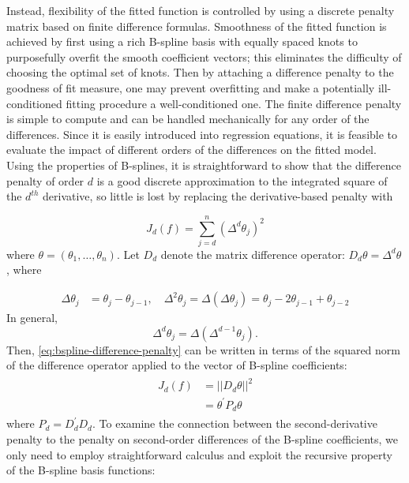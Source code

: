 Instead, flexibility of the fitted function is controlled by using a discrete penalty matrix based on finite difference formulas. Smoothness of the fitted function is achieved by first using a rich B-spline basis with equally spaced knots to purposefully overfit the smooth coefficient vectors; this eliminates the difficulty of choosing the optimal set of knots. Then by attaching a difference penalty to the goodness of fit measure, one may prevent overfitting and make a potentially ill-conditioned fitting procedure a well-conditioned one. The finite difference penalty is simple to compute and can be handled mechanically for any order of the differences. Since it is easily introduced into regression equations, it is feasible to evaluate the impact of different orders of the differences on the fitted model.  Using the properties of B-splines, it is straightforward to show that the difference penalty of order $d$ is a good discrete approximation to the integrated square of the $d^{th}$ derivative, so little is lost by replacing the derivative-based penalty with

\begin{equation} \label{eq:bspline-difference-penalty}
J_d\left( f \right) = \sum_{j=d}^n \left(\Delta^d \theta_j\right)^2
\end{equation} 
\noindent
where $\theta = \left( \theta_1,\dots,\theta_n \right)$. Let $D_d$ denote the matrix difference operator: $D_d\theta = \Delta^d \theta$, where

 \begin{align*}
 \Delta \theta_j &= \theta_j - \theta_{j-1}, \quad  \Delta^2 \theta_j = \Delta\left(\Delta \theta_j\right) = \theta_j - 2\theta_{j-1} + \theta_{j-2}
 \end{align*}
\noindent 
In general,
\begin{equation*}
\Delta^d \theta_j = \Delta\left(\Delta^{d-1} \theta_j \right).
\end{equation*} 
\noindent
Then, \ref{eq:bspline-difference-penalty} can be written in terms of the squared norm of the difference operator applied to the vector of B-spline coefficients:
\begin{align} 
\begin{split} \label{eq:bspline-difference-penalty-vector-form}
J_d\left( f \right) &= \vert \vert D_d\theta \vert \vert^2 \\
&= \theta^\prime P_d \theta
\end{split}
\end{align}
\noindent
where $P_d = D_d^\prime D_d$.  To examine the connection between the second-derivative penalty to the penalty on second-order differences of the B-spline coefficients, we only need to employ straightforward calculus and exploit the recursive property of the B-spline basis functions:

